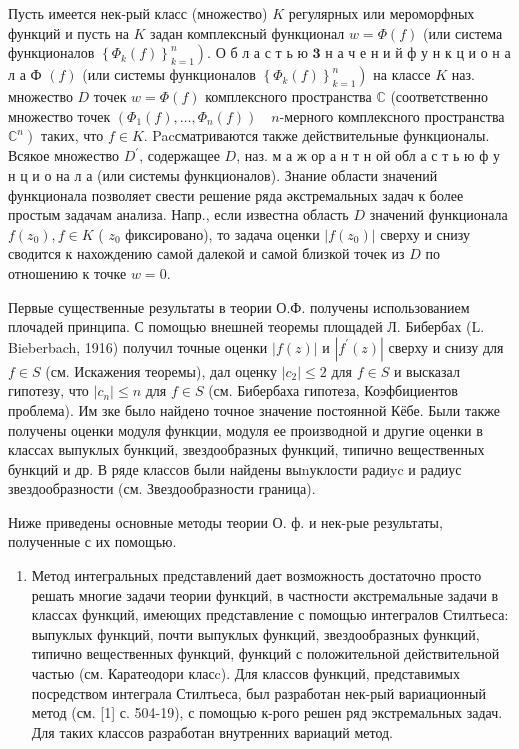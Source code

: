 \documentclass[10pt]{article}
\begin{document}
Пусть имеется нек-рый класс (множество) $K$ регулярных или мероморфных функций и пусть на $K$ задан комплексный функционал $w=\Phi(f)$ (или система функционалов $\left.\left\{\Phi_{k}(f)\right\}_{k=1}^{n}\right)$. О б л а с т ь ю $\mathbf{3}$ н а ч е н и й ф у н к ц и о н а л а Ф $(f)$ (или системы функционалов $\left.\left\{\Phi_{k}(f)\right\}_{k=1}^{n}\right)$ на классе $K$ наз. множество $D$ точек $w=\Phi(f)$ комплексного пространства $\mathbb{C}$ (соответственно множество точек $\left(\Phi_{1}(f), \ldots, \Phi_{n}(f)\right) \quad n$-мерного комплексного пространства $\left.\mathbb{C}^{n}\right)$ таких, что $f \in K$. Pacсматриваются также действительные функционалы. Всякое множество $D^{\prime}$, содержащее $D$, наз. м а ж ор а н т н ой обл а с т ь ю ф у н ц и о на л а (или системы функционалов). Знание области значений функционала позволяет свести решение ряда әкстремальных задач к более простым задачам анализа. Напр., если известна область $D$ значений функционала $f\left(z_{0}\right), f \in K$ ( $z_{0}$ фиксировано), то задача оценки $\left|f\left(z_{0}\right)\right|$ сверху и снизу сводится к нахождению самой далекой и самой близкой точек из $D$ по отношению к точке $w=0$.



Первые существенные результаты в теории О.Ф. получены использованием плочадей принципа. С помощью внешней теоремы площадей Л. Бибербах (L. Bieberbach, 1916) получил точные оценки $|f(z)|$ и $\left|f^{\prime}(z)\right|$ сверху и снизу для $f \in S$ (см. Искажения теоремы), дал оценку $\left|c_{2}\right| \leqslant 2$ для $f \in S$ и высказал гипотезу, что $\left|c_{n}\right| \leqslant n$ для $f \in S$ (см. Бибербаха гипотеза, Коэфбициентов проблема). Им зке было найдено точное значение постоянной Кёбе. Были также получены оценки модуля функции, модуля ее производной и другие оценки в классах выпуклых бункций, звездообразных функций, типично вещественных бункций и др. В ряде классов были найдены выnуклости радиyc и радиус звездообразности (см. Звездообразности граница).



Ниже приведены основные методы теории О. ф. и нек-рые результаты, полученные с их помощью.



\begin{enumerate}

  \item Метод интегральных представлений дает возможность достаточно просто решать многие задачи теории функций, в частности әкстремальные задачи в классах функций, имеющих представление с помощью интегралов Стилтьеса: выпуклых функций, почти выпуклых функций, звездообразных функций, типично вещественных функций, функций с положительной действительной частью (см. Каратеодори класc). Для классов функций, представимых посредством интеграла Стилтьеса, был разработан нек-рый вариационный метод (см. [1] с. 504-19), с помощью к-рого решен ряд экстремальных задач. Для таких классов разработан внутренних вариаций метод.

\end{enumerate}
\end{document}
